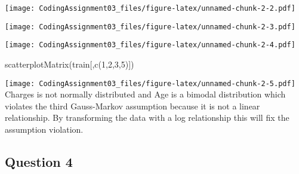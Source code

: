 \documentclass[
]{article}
\newenvironment{Shaded}{\begin{snugshade}}{\end{snugshade}}
\newcommand{\DecValTok}[1]{\textcolor[rgb]{0.00,0.00,0.81}{#1}}
\newcommand{\FunctionTok}[1]{\textcolor[rgb]{0.00,0.00,0.00}{#1}}
\newcommand{\NormalTok}[1]{#1}
\newcommand{\OtherTok}[1]{\textcolor[rgb]{0.56,0.35,0.01}{#1}}
\newcommand{\SpecialCharTok}[1]{\textcolor[rgb]{0.00,0.00,0.00}{#1}}
\begin{document}
\texttt{[image: CodingAssignment03\_files/figure-latex/unnamed-chunk-2-2.pdf]}

\begin{Shaded}
\end{Shaded}

\texttt{[image: CodingAssignment03\_files/figure-latex/unnamed-chunk-2-3.pdf]}

\begin{Shaded}
\end{Shaded}

\texttt{[image: CodingAssignment03\_files/figure-latex/unnamed-chunk-2-4.pdf]}

\begin{Shaded}
\begin{Highlighting}[]
\FunctionTok{scatterplotMatrix}\NormalTok{(train[,}\FunctionTok{c}\NormalTok{(}\DecValTok{1}\NormalTok{,}\DecValTok{2}\NormalTok{,}\DecValTok{3}\NormalTok{,}\DecValTok{5}\NormalTok{)]) }
\end{Highlighting}
\end{Shaded}

\texttt{[image: CodingAssignment03\_files/figure-latex/unnamed-chunk-2-5.pdf]}
Charges is not normally distributed and Age is a bimodal distribution
which violates the third Gauss-Markov assumption because it is not a
linear relationship. By transforming the data with a log relationship
this will fix the assumption violation.

\hypertarget{question-4}{%
\subsection{Question 4}\label{question-4}}
\end{document}
